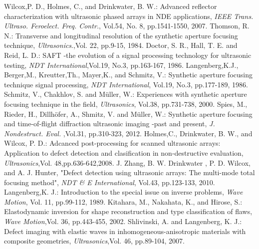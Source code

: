 \documentclass[jscefinal]{jjsce}%
\begin{document}
\begin{thebibliography}{9}
	Wilcox,P. D., Holmes, C., and Drinkwater, B. W.:
	Advanced reflector characterization with ultrasonic phased arrays in NDE applications,
	\textit{ IEEE Trans. Ultraso. Feroelect. Freq. Contr.}, Vol.54, No. 8, pp.1541-1550, 2007.
	Thomson, R. N.:
	Transverse and longitudinal resolution of the synthetic aperture focusing technique,
	\textit{Ultrasonics}.,Vol. 22, pp.9-15, 1984. 
	Doctor, S. R., Hall, T. E. and Reid, L. D.:
	SAFT -the evolution of a signal processing technology for ultrasonic testing,
	\textit{ NDT International},Vol.19, No.3, pp.163-167, 1986. 
	Langenberg,K.J., Berger,M., Kreutter,Th., Mayer,K., and Schmitz, V.:
	Synthetic aperture focusing technique signal processing,
	\textit{NDT International}, Vol.19, No.3, pp.177-189, 1986.
	Schmitz, V.,  Chakhlov, S. and M\"{u}ller, W.:
	Experiences with synthetic aperture focusing technique in the field,
	\textit{ Ultrasonics}, Vol.38, pp.731-738, 2000.
	Spies, M., Rieder, H., Dillh\"{o}fer, A.,  Shmitz, V. and M\"{u}ller, W.:
	Synthetic aperture focusing and time-of-flight diffraction 
	ultrasonic imaging -past and present,
	\textit{ J. Nondestruct. Eval. },Vol.31, pp.310-323, 2012.
	Holmes,C., Drinkwater, B. W., and  Wilcox, P. D.:
	Adcanced post-processing for scanned ultrasonic arrays: Application to 
	defect detection and clasification in non-destructive evaluation,
	\textit{ Ultrasonics},Vol. 48,pp.636-642,2008.
	J. Zhang, B. W. Drinkwater , P. D. Wilcox, and A. J. Hunter,
	"Defect detection using ultrasonic arrays: The multi-mode total focusing method",
	\textit{ NDT \& E International}, Vol.43, pp.123-133, 2010.
	Langenberg,K. J.:
	Introduction to the special issue on inverse problems,
	\textit{ Wave Motion}, Vol. 11, pp.99-112, 1989.
	Kitahara, M., Nakahata, K., and Hirose, S.:
	Elastodynamic inversion for shape reconstruction and type classification of flaws,
	\textit{ Wave Motion},Vol. 36, pp.443-455, 2002.
	Shlivinski, A. and Langenberg, K. J.:
	Defect imaging with elastic waves in inhomogeneous-anisotropic materials with 
	composite geometries,
	\textit{ Ultrasonics},Vol. 46, pp.89-104, 2007.

\end{thebibliography}
\end{document}

